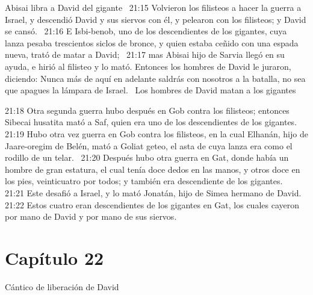 Abisai libra a David del gigante  
21:15 Volvieron los filisteos a hacer la guerra a Israel, y descendió David y sus siervos con él, y pelearon con los filisteos; y David se cansó.  
21:16 E Isbi-benob, uno de los descendientes de los gigantes, cuya lanza pesaba trescientos siclos de bronce, y quien estaba ceñido con una espada nueva, trató de matar a David;  
21:17 mas Abisai hijo de Sarvia llegó en su ayuda, e hirió al filisteo y lo mató. Entonces los hombres de David le juraron, diciendo: Nunca más de aquí en adelante saldrás con nosotros a la batalla, no sea que apagues la lámpara de Israel.  
Los hombres de David matan a los gigantes  

21:18 Otra segunda guerra hubo después en Gob contra los filisteos; entonces Sibecai husatita mató a Saf, quien era uno de los descendientes de los gigantes.  
21:19 Hubo otra vez guerra en Gob contra los filisteos, en la cual Elhanán, hijo de Jaare-oregim de Belén, mató a Goliat geteo, el asta de cuya lanza era como el rodillo de un telar.  
21:20 Después hubo otra guerra en Gat, donde había un hombre de gran estatura, el cual tenía doce dedos en las manos, y otros doce en los pies, veinticuatro por todos; y también era descendiente de los gigantes.  
21:21 Este desafió a Israel, y lo mató Jonatán, hijo de Simea hermano de David.  
21:22 Estos cuatro eran descendientes de los gigantes en Gat, los cuales cayeron por mano de David y por mano de sus siervos.  
\section*{Capítulo 22 }
Cántico de liberación de David  



